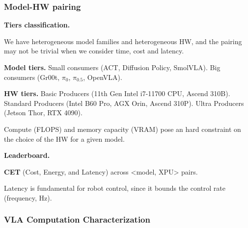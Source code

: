 
\subsubsection{Model-HW pairing}
\textbf{Tiers classification.}
\begin{dashlist}
    \item  We have heterogeneous model families and heterogeneous HW, and the pairing may not be trivial when we consider time, cost and latency.
    \item \textbf{Model tiers.} Small consumers (ACT, Diffusion Policy, SmolVLA). Big consumers (Gr00t, $\pi_0$, $\pi_{0.5}$, OpenVLA).
    \item \textbf{HW tiers.} Basic Producers (11th Gen Intel i7-11700 CPU, Ascend 310B). Standard Producers (Intel B60 Pro, AGX Orin, Ascend 310P). Ultra Producers (Jetson Thor, RTX 4090).
    \item Compute (FLOPS) and memory capacity (VRAM) pose an hard constraint on the choice of the HW for a given model.
\end{dashlist}

\textbf{Leaderboard.}
\begin{dashlist}
    \item \textbf{CET} (Cost, Energy, and Latency) across <model, XPU> pairs.
    \item Latency is fundamental for robot control, since it bounds the control rate (frequency, Hz).
\end{dashlist}

\subsubsection{VLA Computation Characterization}

